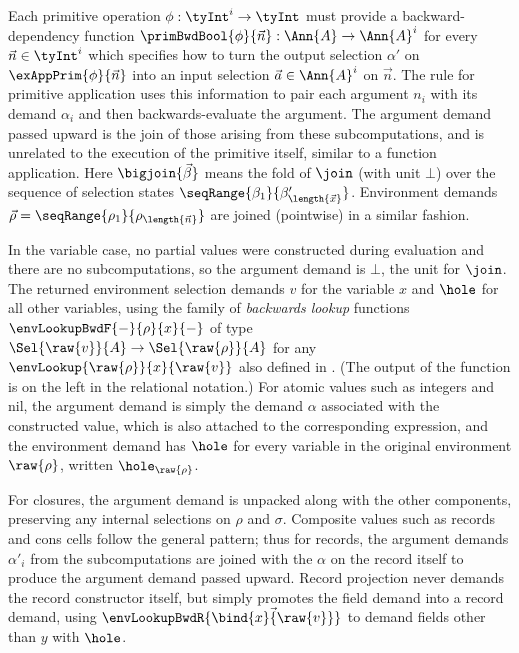  Each primitive operation $\phi: \tyInt^{i} \to \tyInt$ must provide a backward-dependency  function $\primBwdBool{\phi}{\vec{n}}: \Ann{A} \to \Ann{A}^i$ for every $\vec{n} \in \tyInt^i$ which specifies how to turn the output selection $\alpha'$ on $\exAppPrim{\phi}{\vec{n}}$ into an input selection $\vec{a} \in \Ann{A}^i$ on $\vec{n}$. The rule for primitive application uses this information to pair each argument $n_i$ with its demand $\alpha_i$ and then backwards-evaluate the argument. The argument demand passed upward is the join of those arising from these subcomputations, and is unrelated to the execution of the primitive itself, similar to a function application. Here $\bigjoin{\vec{\beta}}$ means the fold of $\join$ (with unit $\bot$) over the sequence of selection states $\seqRange{\beta_1}{\beta_{\length{\vec{x}}}'}$. Environment demands $\vec{\rho} = \seqRange{\rho_1}{\rho_{\length{\vec{n}}}}$ are joined (pointwise) in a similar fashion.

 In the variable case, no partial values were constructed during evaluation and there are no subcomputations, so the argument demand is $\bot$, the unit for $\join$. The returned environment selection demands $v$ for the variable $x$ and $\hole$ for all other variables, using the family of \emph{backwards lookup} functions $\envLookupBwdF{-}{\rho}{x}{-}$ of type $\Sel{\raw{v}}{A} \to \Sel{\raw{\rho}}{A}$ for any $\envLookup{\raw{\rho}}{x}{\raw{v}}$ also defined in . (The output of the function is on the left in the relational notation.) For atomic values such as integers and nil, the argument demand is simply the demand $\alpha$ associated with the constructed value, which is also attached to the corresponding expression, and the environment demand has $\hole$ for every variable in the original environment $\raw{\rho}$, written $\hole_{\raw{\rho}}$.

For closures, the argument demand is unpacked along with the other components, preserving any internal selections on $\rho$ and $\sigma$. Composite values such as records and cons cells follow the general pattern; thus for records, the argument demands $\alpha'_i$ from the subcomputations are joined with the $\alpha$ on the record itself to produce the argument demand passed upward. Record projection never demands the record constructor itself, but simply promotes the field demand into a record demand, using $\envLookupBwdR{\vec{\bind{x}{\raw{v}}}}$ to demand fields other than $y$ with $\hole$.

